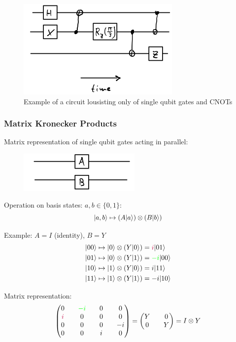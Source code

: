 \begin{figure}[H]
    \centering
    \includegraphics[scale=0.5]{chapters/res/example-qubit-single-qubit-gates-cnot.png}
    \caption{Example of a circuit lousisting only of single qubit gates and CNOTs}
\end{figure}

\subsubsection{Matrix Kronecker Products}
Matrix representation of single qubit gates acting in parallel:

\begin{figure}[H]
    \centering
    \includegraphics[scale=0.5]{chapters/res/parallel-circuit.png}
\end{figure}

Operation on basis states: $a, b \in \{0, 1\}$:
\begin{equation}
    \lvert a, b\rangle \mapsto (A\lvert a\rangle) \otimes (B\lvert b\rangle)
\end{equation}

Example: $A = I$ (identity), $B = Y$
\begin{align*}
    \lvert00\rangle &\mapsto \lvert0\rangle \otimes (Y\lvert0\rangle) = {\color{purple}i}\lvert01\rangle \\
    \lvert01\rangle &\mapsto \lvert0\rangle \otimes (Y\lvert1\rangle) = {\color{green}-i} \lvert00\rangle \\
    \lvert10\rangle &\mapsto \lvert1\rangle \otimes (Y\lvert0\rangle) = i \lvert11\rangle \\
    \lvert11\rangle &\mapsto \lvert1\rangle \otimes (Y\lvert1\rangle) = -i \lvert10\rangle
\end{align*}

Matrix representation:
\begin{equation*}
    \begin{pmatrix*}
        0 && \color{green} -i && 0 && 0 \\
        \color{purple} i && 0 && 0 && 0 \\
        0 && 0 && 0 && -i \\
        0 && 0 && i && 0 \\
    \end{pmatrix*} =
    \begin{pmatrix*}
        Y && 0 \\
        0 && Y
    \end{pmatrix*} = 
    I \otimes Y
\end{equation*}

